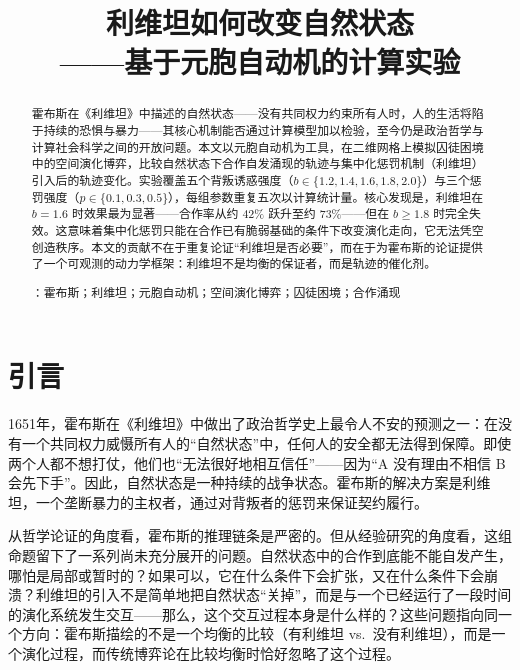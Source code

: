 \documentclass[12pt,a4paper]{ctexart}
\title{{\bfseries 利维坦如何改变自然状态\\[4pt] ——基于元胞自动机的计算实验}}
\author{}
\date{}
\begin{document}
\maketitle

\vspace{-8pt}

\begin{abstract}
\noindent
霍布斯在《利维坦》中描述的自然状态——没有共同权力约束所有人时，人的生活将陷于持续的恐惧与暴力——其核心机制能否通过计算模型加以检验，至今仍是政治哲学与计算社会科学之间的开放问题。本文以元胞自动机为工具，在二维网格上模拟囚徒困境中的空间演化博弈，比较自然状态下合作自发涌现的轨迹与集中化惩罚机制（利维坦）引入后的轨迹变化。实验覆盖五个背叛诱惑强度（$b \in \{1.2, 1.4, 1.6, 1.8, 2.0\}$）与三个惩罚强度（$p \in \{0.1, 0.3, 0.5\}$），每组参数重复五次以计算统计量。核心发现是，利维坦在 $b=1.6$ 时效果最为显著——合作率从约 42\% 跃升至约 73\%——但在 $b \ge 1.8$ 时完全失效。这意味着集中化惩罚只能在合作已有脆弱基础的条件下改变演化走向，它无法凭空创造秩序。本文的贡献不在于重复论证“利维坦是否必要”，而在于为霍布斯的论证提供了一个可观测的动力学框架：利维坦不是均衡的保证者，而是轨迹的催化剂。

\vspace{6pt}
：霍布斯；利维坦；元胞自动机；空间演化博弈；囚徒困境；合作涌现
\end{abstract}

\section{引言}

1651年，霍布斯在《利维坦》中做出了政治哲学史上最令人不安的预测之一：在没有一个共同权力威慑所有人的“自然状态”中，任何人的安全都无法得到保障。即使两个人都不想打仗，他们也“无法很好地相互信任”——因为“A 没有理由不相信 B 会先下手”。因此，自然状态是一种持续的战争状态。霍布斯的解决方案是利维坦，一个垄断暴力的主权者，通过对背叛者的惩罚来保证契约履行。

从哲学论证的角度看，霍布斯的推理链条是严密的。但从经验研究的角度看，这组命题留下了一系列尚未充分展开的问题。自然状态中的合作到底能不能自发产生，哪怕是局部或暂时的？如果可以，它在什么条件下会扩张，又在什么条件下会崩溃？利维坦的引入不是简单地把自然状态“关掉”，而是与一个已经运行了一段时间的演化系统发生交互——那么，这个交互过程本身是什么样的？这些问题指向同一个方向：霍布斯描绘的不是一个均衡的比较（有利维坦 vs.\ 没有利维坦），而是一个演化过程，而传统博弈论在比较均衡时恰好忽略了这个过程。
\end{document}

